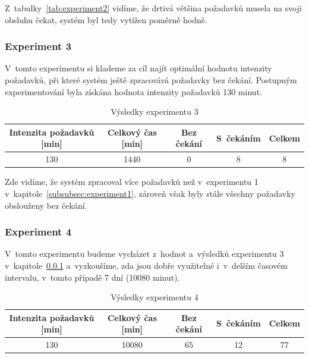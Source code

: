 \documentclass[a4paper]{article}
\begin{document}
                Z~tabulky~\ref{tab:experiment2} vidíme, že drtivá většina požadavků musela na svoji obsluhu čekat,
                systém byl tedy vytížen poměrně hodně.

            \subsubsection{Experiment 3}
            \label{subsubsec:experiment3}

                V~tomto experimentu si klademe za cíl najít optimální hodnotu intenzity požadavků, při které systém ještě zpracovává požadavky bez čekání.
                Postupným experimentování byla získána hodnota intenzity požadavků 130 minut.

                \begin{table}[H]
                    \centering
                    \begin{tabular}{ | c | c | c | c | c | }
                        \hline
                        Intenzita požadavků [min] & Celkový čas [min] & Bez čekání & S~čekáním & Celkem \\
                        \hline
                        \hline
                        130 & 1440 & 0 & 8 & 8 \\
                        \hline
                    \end{tabular}
                    \caption{Výsledky experimentu 3}
                    \label{tab:experiment3}
                \end{table}

                Zde vidíme, že systém zpracoval více požadavků než v~experimentu 1 v~kapitole~\ref{subsubsec:experiment1}, zároveň však byly stále všechny požadavky
                obslouženy bez čekání.

            \subsubsection{Experiment 4}
            \label{subsubsec:experiment4}

                V~tomto experimentu budeme vycházet z~hodnot a~výsledků experimentu 3 v~kapitole~\ref{subsubsec:experiment3} a~vyzkoušíme,
                zda jsou dobře využitelné i~v~delším časovém intervalu, v~tomto případě 7 dní (10080 minut).

                \begin{table}[H]
                    \centering
                    \begin{tabular}{ | c | c | c | c | c | }
                        \hline
                        Intenzita požadavků [min] & Celkový čas [min] & Bez čekání & S~čekáním & Celkem \\
                        \hline
                        \hline
                        130 & 10080 & 65 & 12 & 77 \\
                        \hline
                    \end{tabular}
                    \caption{Výsledky experimentu 4}
                    \label{tab:experiment4}
                \end{table}
\end{document}
